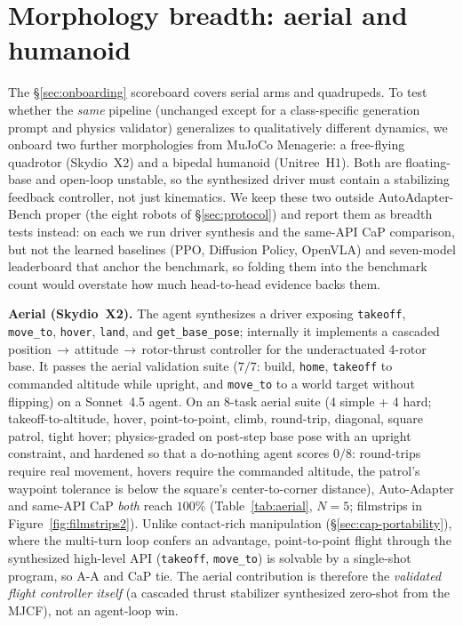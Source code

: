 \section{Morphology breadth: aerial and humanoid}
\label{app:morphology}

The \S\ref{sec:onboarding} scoreboard covers serial arms and quadrupeds.
To test whether the \emph{same} pipeline (unchanged except for a
class-specific generation prompt and physics validator) generalizes to
qualitatively different dynamics, we onboard two further morphologies from
MuJoCo Menagerie: a free-flying quadrotor (Skydio~X2) and a bipedal humanoid
(Unitree~H1). Both are floating-base and open-loop unstable, so the
synthesized driver must contain a stabilizing feedback controller, not just
kinematics. We keep these two outside AutoAdapter-Bench proper (the eight
robots of \S\ref{sec:protocol}) and report them as breadth tests instead:
on each we run driver synthesis and the same-API CaP comparison, but not
the learned baselines (PPO, Diffusion Policy, OpenVLA) and seven-model
leaderboard that anchor the benchmark, so folding them into the benchmark count
would overstate how much head-to-head evidence backs them.

\noindent\textbf{Aerial (Skydio~X2).} The agent synthesizes a driver exposing
\texttt{takeoff}, \texttt{move\_to}, \texttt{hover}, \texttt{land}, and
\texttt{get\_base\_pose}; internally it implements a cascaded
position\,$\rightarrow$\,attitude\,$\rightarrow$\,rotor-thrust controller for
the underactuated 4-rotor base. It passes the aerial validation suite
($7/7$: build, \texttt{home}, \texttt{takeoff} to commanded altitude while upright, and
\texttt{move\_to} to a world target without flipping) on a Sonnet~4.5 agent.
On an 8-task aerial suite (4 simple + 4 hard; takeoff-to-altitude, hover,
point-to-point, climb, round-trip, diagonal, square patrol, tight hover;
physics-graded on post-step base pose with an upright constraint, and
hardened so that a do-nothing agent scores $0/8$: round-trips require real
movement, hovers require the commanded altitude, the patrol's waypoint
tolerance is below the square's center-to-corner distance), Auto-Adapter and
same-API CaP \emph{both} reach $100\%$ (Table~\ref{tab:aerial}, $N{=}5$;
filmstrips in Figure~\ref{fig:filmstrips2}).
Unlike contact-rich manipulation (\S\ref{sec:cap-portability}),
where the multi-turn loop confers an advantage,
point-to-point flight through the synthesized high-level API
(\texttt{takeoff}, \texttt{move\_to}) is solvable by a single-shot program, so
A-A and CaP tie. The aerial contribution is therefore the \emph{validated
flight controller itself} (a cascaded thrust stabilizer synthesized zero-shot
from the MJCF), not an agent-loop win.

